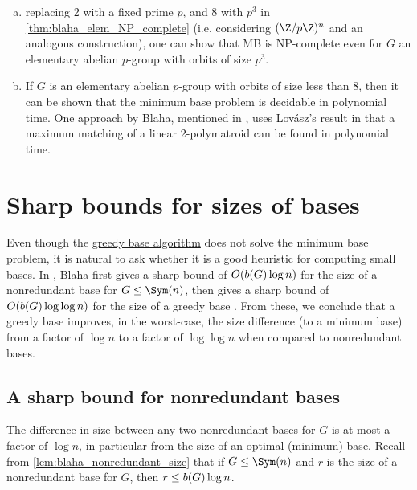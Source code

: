 \begin{remark}\label{rem:blaha_elem_greedy}
    \begin{enumerate}[(a)]
        \item {} replacing 2 with a fixed prime $p$, and 8 with $p^3$ in \autoref{thm:blaha_elem_NP_complete} (i.e. considering $(\Z/p\Z)^n$ and an analogous construction), one can show that MB is NP-complete even for $G$ an elementary abelian $p$-group with orbits of size $p^3$.
        \item If $G$ is an elementary abelian $p$-group with orbits of size less than 8, then it can be shown that the minimum base problem is decidable in polynomial time. One approach by Blaha, mentioned in \cite{blaha1992}, uses Lov\'asz's result in \cite{lovasz1980} that a maximum matching of a linear 2-polymatroid can be found in polynomial time.
    \end{enumerate}
\end{remark}

\section{Sharp bounds for sizes of bases}

Even though the \hyperref[alg:blaha_greedy_base]{greedy base algorithm} does not solve the minimum base problem, it is natural to ask whether it is a good heuristic for computing small bases. In \cite{blaha1992}, Blaha first gives a sharp bound of $O(\added{2}{b(G)}\log n)$ for the size of a nonredundant base for $G \leq \Sym(n)$, then gives a sharp bound of $O(\added{2}{b(G)}\log\log n)$ for the size of a greedy base . From these, we conclude that a greedy base improves, in the worst-case, the size difference (to a minimum base) from a factor of $\log n$ to a factor of $\log\log n$ when compared to nonredundant bases.

\subsection{A sharp bound for nonredundant bases}

The difference in size between any two nonredundant bases for $G$ is at most a factor of $\log n$, in particular from the size of an optimal (minimum) base. Recall from \autoref{lem:blaha_nonredundant_size} that if $G \leq \Sym(n)$ and $r$ is the size of a nonredundant base for $G$, then $r \leq \added{2}{b(G)}\log n$.

